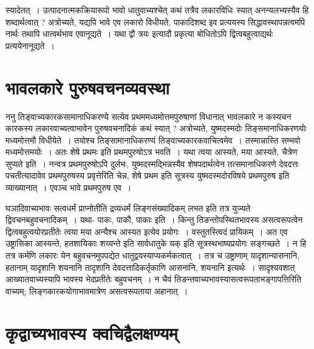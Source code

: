 {स्यादेतत्~। उत्पादनात्मकक्रियारूपो भावो धातुवाच्यश्चेत् कथं तत्रैव लकारविधिः स्यात् अनन्यलभ्यस्यैव हि शब्दार्थत्वात् ? अत्रोच्यते, यद्यपि भावे एव लकारो विधीयते, पाकादिशब्द इव प्रत्ययस्य सिद्धावस्थापन्नत्वमपि नार्थः तथापि धात्वर्थभाव एवानूद्यते~। यथा द्वौ त्रयः इत्यादौ प्रकृत्या बोधितोऽपि द्वित्वबहुत्वाद्यर्थः प्रत्ययेनानूद्यते~। 

\section*{भावलकारे पुरुषवचनव्यवस्था} 

ननु तिङ्वाच्यकारकसामानाधिकरण्ये सत्येव प्रथममध्यमोत्तमपुरुषाणां विधानात् भावलकारे न कस्यचन कारकस्य लकारवाच्यत्वाभावेन पुरुषवचनादिकं कथं स्यात् ? अत्रोच्यते, युष्मदस्मदोः तिङ्समानाधिकरणयोः मध्यमोत्तमौ विधीयेते~। तयोश्च तिङ्सामानाधिकरण्यं तिङ्वाच्यकारकवाचित्वमेव~। तस्मान्नास्ति सम्भवो मध्यमोत्तमयोः~। अतः शेषे प्रथमः इति प्रथमपुरुषोऽत्र भवति~। यथा त्वया आस्यते, मया आस्यते, चैत्रेण सुप्यते इति~। नन्वत्र प्रथमपुरुषोऽपि दुर्लभः, युष्मदस्मद्भिन्नस्यैव शेषपदार्थत्वेन तत्समानाधिकरणे देवदत्तः पचतीत्यादावेव प्रथमपुरुषस्य प्रवृत्तेरिति चेन्न, शेषे प्रथम इति सूत्रस्य युष्मदस्मदोरविषये प्रथमपुरुष इति व्याख्यानात्~। एवञ्च भावे प्रथमपुरुष एव~। 

घञादिवाच्यभावः सत्वधर्मं प्राप्नोतीति द्रव्यधर्मं लिङ्गसंख्यादिकम् लभत इति तत्र युज्यते द्विवचनबहुवचनादिकम्~। यथा- पाकः, पाकौ, पाकाः इति~। किन्तु तिङन्तोपस्थितभावस्य असत्वरूपत्वेन द्वित्वबहुत्वयोरप्रतीतेः त्वया मया अन्यैश्च आस्यत इत्येव प्रयोगः~। वस्तुतस्त्विदं प्रायिकम्~। अत एव उष्ट्रासिका आस्यन्ते, हतशायिकाः शय्यन्ते इति सार्वधातुके यक् इति सूत्रस्थभाष्यप्रयोगः सङ्गच्छते~। न हि तत्र कर्मणि लकारः येन बहुवचनमुपपद्येत धातुद्वयस्याप्यकर्मकत्वात्~। तत्र च उष्ट्राणाम् यादृशान्यासनानि, हतानाम् यादृशानि शयनानि तादृशानि देवदत्तादिकर्तृकाणि आसनानि, शयनानि इत्यर्थः~। सादृश्यवशात् आख्यातवाच्यस्यापि भावस्य भेदप्रतीतेः बहुवचनम्~। न चैवं तिङन्तवाच्यभावस्यासत्वरूपताभङ्गापत्तिरिति वाच्यम्; लिङ्गकारकयोगाभावमात्रेण असत्वरूपताया अहानात्~। 
\newpage

\section*{कृद्वाच्यभावस्य क्वचिद्वैलक्षण्यम्} 

}
